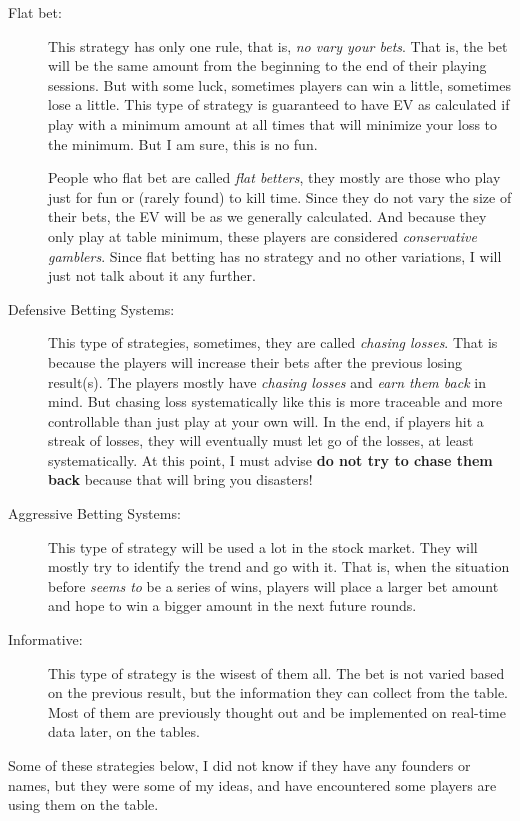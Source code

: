 \documentclass{article}
\begin{document}
\begin{description}
\item[Flat bet:] This strategy has only one rule, that is, \emph{no vary your bets}.  That is, the bet will be the same amount from the beginning to the end of their playing sessions.  But with some luck, sometimes players can win a little, sometimes lose a little.  This type of strategy is guaranteed to have EV as calculated if play with a minimum amount at all times that will minimize your loss to the minimum.  But I am sure, this is no fun.  

People who flat bet are called \emph{flat betters}, they mostly are those who play just for fun or (rarely found) to kill time.  Since they do not vary the size of their bets, the EV will be as we generally calculated.  And because they only play at table minimum, these players are considered \emph{conservative gamblers}. Since flat betting has no strategy and no other variations, I will just not talk about it any further.\\
\item[Defensive Betting Systems:] This type of strategies, sometimes, they are called \emph{chasing losses}. That is because the players will increase their bets after the previous losing result(s).  The players mostly have \emph{chasing losses} and \emph{earn them back} in mind.  But chasing loss systematically like this is more traceable and more controllable than just play at your own will.  In the end, if players hit a streak of losses, they will eventually must let go of the losses, at least systematically.  At this point, I must advise \textbf{do not try to chase them back} because that will bring you disasters! 
\item[Aggressive Betting Systems:] This type of strategy will be used a lot in the stock market.  They will mostly try to identify the trend and go with it.  That is, when the situation before \emph{seems to} be a series of wins, players will place a larger bet amount and hope to win a bigger amount in the next future rounds.  
\item[Informative:] This type of strategy is the wisest of them all.  The bet is not varied based on the previous result, but the information they can collect from the table.  Most of them are previously thought out and be implemented on real-time data later, on the tables.
\end{description} 

Some of these strategies below, I did not know if they have any founders or names, but they were some of my ideas, and have encountered some players are using them on the table.\\
\end{document}
